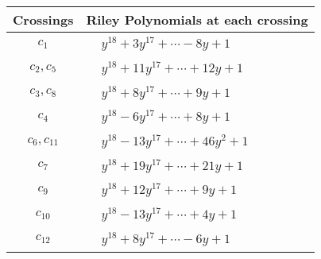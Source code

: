 \documentclass[1p]{elsarticle_modified}
\theoremstyle{definition}
\begin{document}
\begin{tabular}{m{50pt}|m{274pt}}
Crossings & \hspace{64pt}Riley Polynomials at each crossing \\
\hline $$\begin{aligned}c_{1}\end{aligned}$$&$\begin{aligned}
&y^{18}+3 y^{17}+\cdots-8 y+1
\end{aligned}$\\
\hline $$\begin{aligned}c_{2},c_{5}\end{aligned}$$&$\begin{aligned}
&y^{18}+11 y^{17}+\cdots+12 y+1
\end{aligned}$\\
\hline $$\begin{aligned}c_{3},c_{8}\end{aligned}$$&$\begin{aligned}
&y^{18}+8 y^{17}+\cdots+9 y+1
\end{aligned}$\\
\hline $$\begin{aligned}c_{4}\end{aligned}$$&$\begin{aligned}
&y^{18}-6 y^{17}+\cdots+8 y+1
\end{aligned}$\\
\hline $$\begin{aligned}c_{6},c_{11}\end{aligned}$$&$\begin{aligned}
&y^{18}-13 y^{17}+\cdots+46 y^2+1
\end{aligned}$\\
\hline $$\begin{aligned}c_{7}\end{aligned}$$&$\begin{aligned}
&y^{18}+19 y^{17}+\cdots+21 y+1
\end{aligned}$\\
\hline $$\begin{aligned}c_{9}\end{aligned}$$&$\begin{aligned}
&y^{18}+12 y^{17}+\cdots+9 y+1
\end{aligned}$\\
\hline $$\begin{aligned}c_{10}\end{aligned}$$&$\begin{aligned}
&y^{18}-13 y^{17}+\cdots+4 y+1
\end{aligned}$\\
\hline $$\begin{aligned}c_{12}\end{aligned}$$&$\begin{aligned}
&y^{18}+8 y^{17}+\cdots-6 y+1
\end{aligned}$\\
\hline
\end{tabular}\\~\\
\end{document}
